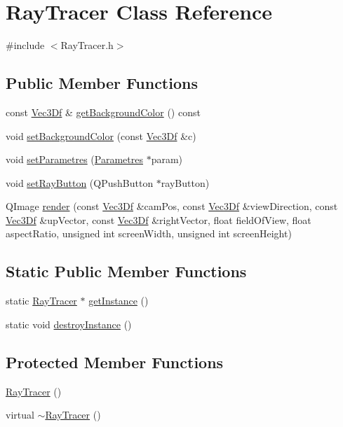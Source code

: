 \hypertarget{class_ray_tracer}{
\section{RayTracer Class Reference}
\label{class_ray_tracer}
}


{\ttfamily \#include $<$RayTracer.h$>$}

\subsection*{Public Member Functions}
\begin{DoxyCompactItemize}
\item 
const \hyperlink{class_vec3_d}{Vec3Df} \& \hyperlink{class_ray_tracer_a8232047f622bcad4c4bcc2e9b3f994e8}{getBackgroundColor} () const 
\item 
void \hyperlink{class_ray_tracer_a78c48fc5448e6fdbaaa2dacc00c1f52d}{setBackgroundColor} (const \hyperlink{class_vec3_d}{Vec3Df} \&c)
\item 
void \hyperlink{class_ray_tracer_a7fb36466bbdc06e9084c2af6393e71f6}{setParametres} (\hyperlink{class_parametres}{Parametres} $\ast$param)
\item 
void \hyperlink{class_ray_tracer_a0fefb72c52244a0b4785d4dc595b6a04}{setRayButton} (QPushButton $\ast$rayButton)
\item 
QImage \hyperlink{class_ray_tracer_a514cb132e6f69be5658c5afb5651809b}{render} (const \hyperlink{class_vec3_d}{Vec3Df} \&camPos, const \hyperlink{class_vec3_d}{Vec3Df} \&viewDirection, const \hyperlink{class_vec3_d}{Vec3Df} \&upVector, const \hyperlink{class_vec3_d}{Vec3Df} \&rightVector, float fieldOfView, float aspectRatio, unsigned int screenWidth, unsigned int screenHeight)
\end{DoxyCompactItemize}
\subsection*{Static Public Member Functions}
\begin{DoxyCompactItemize}
\item 
static \hyperlink{class_ray_tracer}{RayTracer} $\ast$ \hyperlink{class_ray_tracer_af849b82f2b2c0cfe5a29e1f63c91aa8b}{getInstance} ()
\item 
static void \hyperlink{class_ray_tracer_a18c26a7f9a11ddef3af7dc9431fa240b}{destroyInstance} ()
\end{DoxyCompactItemize}
\subsection*{Protected Member Functions}
\begin{DoxyCompactItemize}
\item 
\hyperlink{class_ray_tracer_a7f59fcfc6b645680b6c5723df307e6e9}{RayTracer} ()
\item 
virtual \hyperlink{class_ray_tracer_ae4df044d612275c3923d5adabea538f5}{$\sim$RayTracer} ()
\end{DoxyCompactItemize}


